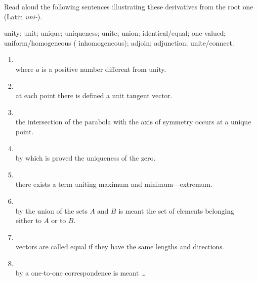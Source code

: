 \begin{keybox}[Exercise 5.11]
Read aloud the following sentences illustrating these derivatives from the root  one (Latin \emph{uni-}).
\end{keybox}

\noindent{} unity;  unit;  unique;  uniqueness;  unite;  union;  identical/equal;  one-valued;  uniform/homogeneous ( inhomogeneous);  adjoin;  adjunction;  unite/connect.

\begin{enumerate}[label=\arabic*)]
\item {}\\
      where $a$ is a positive number different from unity.
\item {}\\
      at each point there is defined a unit tangent vector.
\item {}\\
      the intersection of the parabola with the axis of symmetry occurs at a unique point.
\item {}\\
      by which is proved the uniqueness of the zero.
\item {}\\
      there exists a term uniting maximum and minimum---extremum.
\item {}\\
      by the union of the sets $A$ and $B$ is meant the set of elements belonging either to $A$ or to $B$.
\item {}\\
      vectors are called equal if they have the same lengths and directions.
\item {}\\
      by a one-to-one correspondence is meant \ldots

\end{enumerate}
